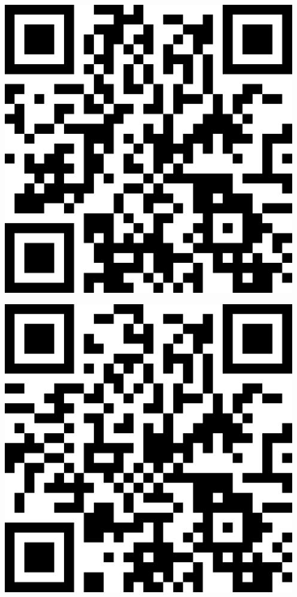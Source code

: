 \documentclass[letterpaper]{article}
\begin{document}
 \endgroup 
 \vspace*{\fill} 
 \pagebreak 
{} 
 \vspace*{\fill} 
 \begingroup 
 \centerline{\includegraphics[scale=1,width=5in,height=5in]{Class3435S.png}} 
 \endgroup 
 \vspace*{\fill} 
 \pagebreak 
{} 
 \vspace*{\fill} 
 \begingroup 
 \centerline{\includegraphics[scale=1,width=5in,height=5in]{Class3445.png}} 
\end{document}
